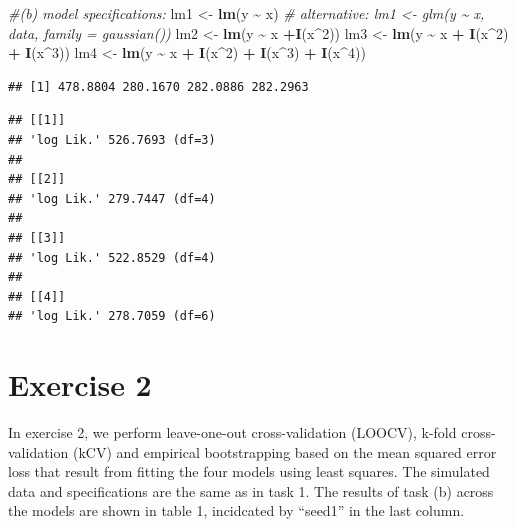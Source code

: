 \documentclass[
]{article}
\newenvironment{Shaded}{\begin{snugshade}}{\end{snugshade}}
\newcommand{\CommentTok}[1]{\textcolor[rgb]{0.56,0.35,0.01}{\textit{#1}}}
\newcommand{\DecValTok}[1]{\textcolor[rgb]{0.00,0.00,0.81}{#1}}
\newcommand{\FunctionTok}[1]{\textcolor[rgb]{0.13,0.29,0.53}{\textbf{#1}}}
\newcommand{\NormalTok}[1]{#1}
\newcommand{\OtherTok}[1]{\textcolor[rgb]{0.56,0.35,0.01}{#1}}
\newcommand{\SpecialCharTok}[1]{\textcolor[rgb]{0.81,0.36,0.00}{\textbf{#1}}}
\begin{document}
\begin{Shaded}
\begin{Highlighting}[]
\CommentTok{\#(b) model specifications:}
\NormalTok{lm1 }\OtherTok{\textless{}{-}} \FunctionTok{lm}\NormalTok{(y }\SpecialCharTok{\textasciitilde{}}\NormalTok{ x) }\CommentTok{\# alternative: lm1 \textless{}{-} glm(y \textasciitilde{} x, data, family = gaussian()) }
\NormalTok{lm2 }\OtherTok{\textless{}{-}} \FunctionTok{lm}\NormalTok{(y }\SpecialCharTok{\textasciitilde{}}\NormalTok{ x }\SpecialCharTok{+}\FunctionTok{I}\NormalTok{(x}\SpecialCharTok{\^{}}\DecValTok{2}\NormalTok{))}
\NormalTok{lm3 }\OtherTok{\textless{}{-}} \FunctionTok{lm}\NormalTok{(y }\SpecialCharTok{\textasciitilde{}}\NormalTok{ x }\SpecialCharTok{+} \FunctionTok{I}\NormalTok{(x}\SpecialCharTok{\^{}}\DecValTok{2}\NormalTok{) }\SpecialCharTok{+} \FunctionTok{I}\NormalTok{(x}\SpecialCharTok{\^{}}\DecValTok{3}\NormalTok{))}
\NormalTok{lm4 }\OtherTok{\textless{}{-}} \FunctionTok{lm}\NormalTok{(y }\SpecialCharTok{\textasciitilde{}}\NormalTok{ x }\SpecialCharTok{+} \FunctionTok{I}\NormalTok{(x}\SpecialCharTok{\^{}}\DecValTok{2}\NormalTok{) }\SpecialCharTok{+} \FunctionTok{I}\NormalTok{(x}\SpecialCharTok{\^{}}\DecValTok{3}\NormalTok{) }\SpecialCharTok{+} \FunctionTok{I}\NormalTok{(x}\SpecialCharTok{\^{}}\DecValTok{4}\NormalTok{))}
\end{Highlighting}
\end{Shaded}

\begin{verbatim}
## [1] 478.8804 280.1670 282.0886 282.2963
\end{verbatim}

\begin{verbatim}
## [[1]]
## 'log Lik.' 526.7693 (df=3)
## 
## [[2]]
## 'log Lik.' 279.7447 (df=4)
## 
## [[3]]
## 'log Lik.' 522.8529 (df=4)
## 
## [[4]]
## 'log Lik.' 278.7059 (df=6)
\end{verbatim}

\hypertarget{exercise-2}{%
\section{Exercise 2}\label{exercise-2}}

In exercise 2, we perform leave-one-out cross-validation (LOOCV), k-fold
cross-validation (kCV) and empirical bootstrapping based on the mean
squared error loss that result from fitting the four models using least
squares. The simulated data and specifications are the same as in task
1. The results of task (b) across the models are shown in table 1,
incidcated by ``seed1'' in the last column.
\end{document}

